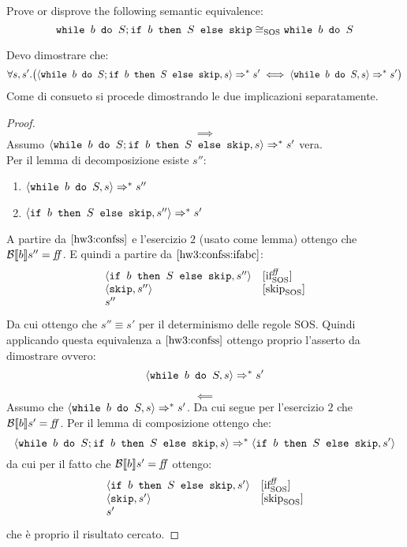 {
  Prove or disprove the following semantic equivalence:
  $$
  \wbS{b}{S}; \ifABC{b}{S}{\skipForFriends} \eqSOS \wbS{b}{S}
  $$
}
{
  Devo dimostrare che:
  $$
  \forall s, s'. \big( \confSs{\wbS{b}{S}; \ifABC{b}{S}{\skipForFriends}}{s}
  \Rar{*} s' \iff \confSs{\wbS{b}{S}}{s} \Rar{*} s'\big)
  $$
  Come di consueto si procede dimostrando le due implicazioni separatamente.
  \begin{proof}
    $$
    \boxed{\implies}
    $$
    Assumo $\confSs{\wbS{b}{S}; \ifABC{b}{S}{\skipForFriends}}{s} \Rar{*}
    s'$ vera. \\
    Per il lemma di decomposizione esiste $s''$:
    \begin{enumerate}
    \item $\confSs{\wbS{b}{S}}{s} \Rar{*} s''$
      \label{hw3:confss}
    \item $\confSs{\ifABC{b}{S}{\skipForFriends}}{s''} \Rar{*} s'$
      \label{hw3:confss:ifabc}
    \end{enumerate}
    A partire da $\ref{hw3:confss}$ e l'esercizio $2$ (usato come lemma) 
   ottengo che $\B{b}'' =
    \semfalse$. E quindi a partire da $\ref{hw3:confss:ifabc}$:
    $$
    \begin{array}{ll}
      \confSs{\ifABC{b}{S}{\skipForFriends}}{s''} & \ifffSOS \\
      \confSs{\skipForFriends}{s''} & \skipSOS \\
      s''
    \end{array}
    $$
    Da cui ottengo che $\boxed{s'' \equiv s'}$ per il determinismo delle regole SOS.
    Quindi applicando questa equivalenza a $\ref{hw3:confss}$ ottengo proprio
    l'asserto da dimostrare ovvero:
    $$
    \confSs{\wbS{b}{S}}{s} \Rar{*} s'
    $$
    
    $$
    \boxed{\impliedby}
    $$
    Assumo che $\confSs{\wbS{b}{S}}{s} \Rar{*} s'$. Da cui segue per
    l'esercizio $2$ che $\B{b}' = \semfalse$.
    Per il lemma di composizione ottengo che:
    $$
    \confSs{\wbS{b}{S}; \ifABC{b}{S}{\skipForFriends}}{s} \Rar{*} \confSs{\ifABC{b}{S}{\skipForFriends}}{s'}
    $$
    da cui per il fatto che $\B{b}' = \semfalse$ ottengo:
    $$
    \begin{array}{ll}
      \confSs{\ifABC{b}{S}{\skipForFriends}}{s'} & \ifffSOS \\
      \confSs{\skipForFriends}{s'} & \skipSOS \\
      s' & \\
    \end{array}
    $$
    che è proprio il risultato cercato.
  
    
  

  \end{proof}
  
}
